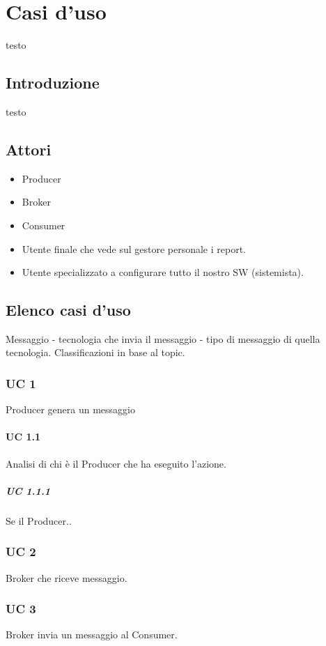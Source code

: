 \section{Casi d'uso}
testo

	\subsection{Introduzione}
	testo
	
	\subsection{Attori}
	\begin{itemize}
		\item Producer
		\item Broker
		\item Consumer
		\item Utente finale che vede sul gestore personale i report.
		\item Utente specializzato a configurare tutto il nostro SW (sistemista).
	\end{itemize}
	
	\subsection{Elenco casi d'uso}
	Messaggio - tecnologia che invia il messaggio - tipo di messaggio di quella tecnologia.
	Classificazioni in base al topic.
	
		\subsubsection{UC 1}
		 Producer genera un messaggio 
		
			\paragraph{UC 1.1}
			Analisi di chi è il Producer che ha eseguito l'azione.
			
			\subparagraph{UC 1.1.1}
			Se il Producer..
		
		\subsubsection{UC 2}
		Broker che riceve messaggio.
		
		\subsubsection{UC 3}
		Broker invia un messaggio al Consumer.
			
